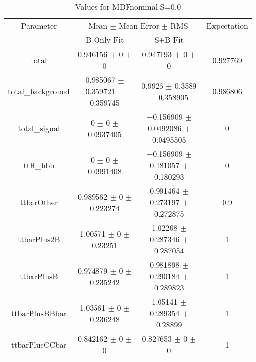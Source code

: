 \begin{table}
\centering
\caption{Values for MDFnominal S=0.0}
\begin{tabular}{cccc}
\toprule
Parameter & \multicolumn{2}{c}{Mean $\pm$ Mean Error $\pm$ RMS} & Expectation\\
 & B-Only Fit & S+B Fit & \\
\midrule
total & \num{0.946156} $\pm$ \num{0} $\pm$ \num{0} & \num{0.947193} $\pm$ \num{0} $\pm$ \num{0} & \num{0.927769}\\
total\_background & \num{0.985067} $\pm$ \num{0.359721} $\pm$ \num{0.359745} & \num{0.9926} $\pm$ \num{0.3589} $\pm$ \num{0.358905} & \num{0.986806}\\
total\_signal & \num{0} $\pm$ \num{0} $\pm$ \num{0.0937405} & \num{-0.156909} $\pm$ \num{0.0492086} $\pm$ \num{0.0495505} & \num{0}\\
ttH\_hbb & \num{0} $\pm$ \num{0} $\pm$ \num{0.0991408} & \num{-0.156909} $\pm$ \num{0.181057} $\pm$ \num{0.180293} & \num{0}\\
ttbarOther & \num{0.989562} $\pm$ \num{0} $\pm$ \num{0.223274} & \num{0.991464} $\pm$ \num{0.273197} $\pm$ \num{0.272875} & \num{0.9}\\
ttbarPlus2B & \num{1.00571} $\pm$ \num{0} $\pm$ \num{0.23251} & \num{1.02268} $\pm$ \num{0.287346} $\pm$ \num{0.287054} & \num{1}\\
ttbarPlusB & \num{0.974879} $\pm$ \num{0} $\pm$ \num{0.235242} & \num{0.981898} $\pm$ \num{0.290184} $\pm$ \num{0.289823} & \num{1}\\
ttbarPlusBBbar & \num{1.03561} $\pm$ \num{0} $\pm$ \num{0.236248} & \num{1.05141} $\pm$ \num{0.289354} $\pm$ \num{0.28899} & \num{1}\\
ttbarPlusCCbar & \num{0.842162} $\pm$ \num{0} $\pm$ \num{0} & \num{0.827653} $\pm$ \num{0} $\pm$ \num{0} & \num{1}\\
\bottomrule
\end{tabular}
\end{table}
